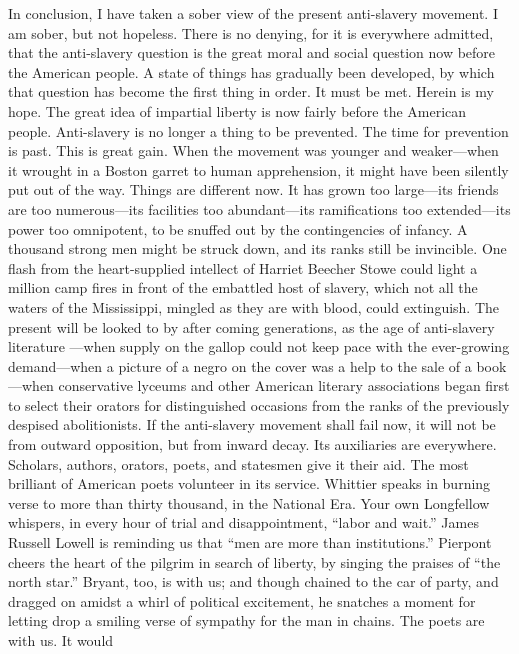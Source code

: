 In conclusion, I have taken a sober view of the present anti-slavery
movement. I am sober, but not hopeless. There is no denying, for it is
everywhere admitted, that the anti-slavery question is the great moral
and social question now before the American people. A state of things
has gradually been developed, by which that question has become the
first thing in order. It must be met. Herein is my hope. The great idea
of impartial liberty is now fairly before the American people.
Anti-slavery is no longer a thing to be prevented. The time for
prevention is past. This is great gain. When the movement was younger
and weaker---when it wrought in a Boston garret to human apprehension,
it might have been silently put out of the way. Things are different
now. It has grown too large---its friends are too numerous---its
facilities too abundant---its ramifications too extended---its power too
omnipotent, to be snuffed out by the contingencies of infancy. A
thousand strong men might be struck down, and its ranks still be
invincible. One flash from the heart-supplied intellect of Harriet
Beecher Stowe could light a million camp fires in front of the embattled
host of slavery, which not all the waters of the Mississippi, mingled as
they are with blood, could extinguish. The present will be looked to by
after coming generations, as the age of anti-slavery literature
{\protect\hypertarget{462}{}{}}---when supply on the gallop could not
keep pace with the ever-growing demand---when a picture of a negro on
the cover was a help to the sale of a book---when conservative lyceums
and other American literary associations began first to select their
orators for distinguished occasions from the ranks of the previously
despised abolitionists. If the anti-slavery movement shall fail now, it
will not be from outward opposition, but from inward decay. Its
auxiliaries are everywhere. Scholars, authors, orators, poets, and
statesmen give it their aid. The most brilliant of American poets
volunteer in its service. Whittier speaks in burning verse to more than
thirty thousand, in the National Era. Your own Longfellow whispers, in
every hour of trial and disappointment, ``labor and wait.'' James
Russell Lowell is reminding us that ``men are more than institutions.''
Pierpont cheers the heart of the pilgrim in search of liberty, by
singing the praises of ``the north star.'' Bryant, too, is with us; and
though chained to the car of party, and dragged on amidst a whirl of
political excitement, he snatches a moment for letting drop a smiling
verse of sympathy for the man in chains. The poets are with us. It would

